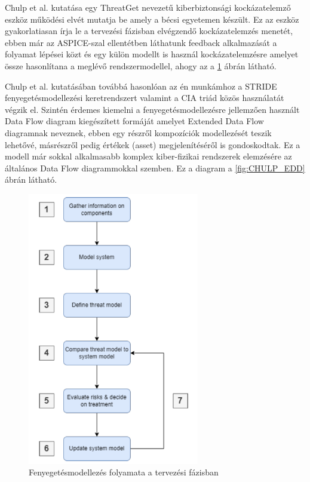 Chulp et al.\cite{Chulp} kutatása egy ThreatGet nevezetű kiberbiztonsági kockázatelemző eszköz működési elvét mutatja be amely a bécsi egyetemen készült. Ez az eszköz gyakorlatiasan írja le a tervezési fázisban elvégzendő kockázatelemzés menetét, ebben már az ASPICE-szal ellentétben láthatunk feedback alkalmazását a folyamat lépései közt és egy külön modellt is használ kockázatelemzésre amelyet össze hasonlítana a meglévő rendszermodellel, ahogy az a \ref{fig:CHULP} ábrán látható.

Chulp et al.\cite{Chulp} kutatásában továbbá hasonlóan az én munkámhoz a STRIDE fenyegetésmodellezési keretrendszert valamint a CIA triád közös használatát végzik el. Szintén érdemes kiemelni a fenyegetésmodellezésre jellemzően használt Data Flow diagram kiegészített formáját amelyet Extended Data Flow diagramnak neveznek, ebben egy részről kompozíciók modellezését teszik lehetővé, másrészről pedig értékek (asset) megjelenítéséről is gondoskodtak. Ez a modell már sokkal alkalmasabb komplex kiber-fizikai rendszerek elemzésére az általános Data Flow diagrammokkal szemben. Ez a diagram a \ref{fig:CHULP_EDD} ábrán látható.

\begin{figure}[!ht]
	\centering
	\includegraphics[width=75mm, keepaspectratio]{figures/03_CHULP.png}
	\caption{Fenyegetésmodellezés folyamata a tervezési fázisban\cite{Chulp}}
	\label{fig:CHULP}
\end{figure}

